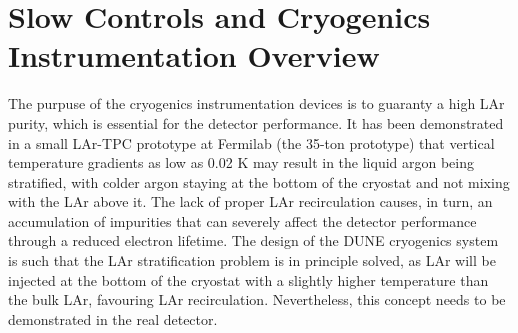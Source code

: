\section{Slow Controls and Cryogenics Instrumentation Overview}
\label{sec:fdsp-slow-cryo-ov}



The purpuse of the cryogenics instrumentation devices is to guaranty a high LAr purity, which is essential for the detector performance.  
It has been demonstrated in a small LAr-TPC prototype at Fermilab (the 35-ton prototype) that vertical temperature gradients
as low as 0.02 K may result in the liquid argon being stratified, with colder argon staying at the bottom of the cryostat and not mixing
with the LAr above it. The lack of proper LAr recirculation causes, in turn, an accumulation of impurities that
can severely affect the detector performance through a reduced electron lifetime. The design of the DUNE cryogenics
system is such that the LAr stratification problem
is in principle solved, as LAr will be injected at the bottom of the cryostat with a slightly higher temperature than the bulk LAr,
favouring LAr recirculation. Nevertheless, this concept needs to be demonstrated in the real detector. 
